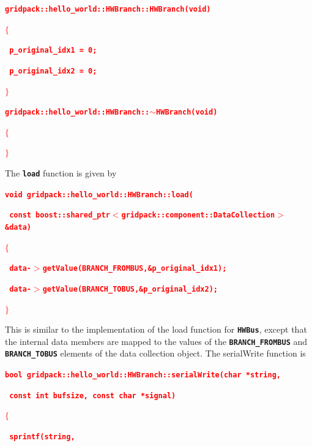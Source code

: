 \documentclass[12pt]{report} %
\begin{document}
\textcolor{red}{\texttt{\textbf{gridpack::hello\_world::HWBranch::HWBranch(void)}}}

\textcolor{red}{\texttt{\textbf{$\boldsymbol{\mathrm{\{}}$}}}

\textcolor{red}{\texttt{\textbf{  p\_original\_idx1 = 0;}}}

\textcolor{red}{\texttt{\textbf{  p\_original\_idx2 = 0;}}}

\textcolor{red}{\texttt{\textbf{$\boldsymbol{\mathrm{\}}}$}}}

\textcolor{red}{\texttt{\textbf{gridpack::hello\_world::HWBranch::$\boldsymbol{\mathrm{\sim}}$HWBranch(void)}}}

\textcolor{red}{\texttt{\textbf{$\boldsymbol{\mathrm{\{}}$}}}

\textcolor{red}{\texttt{\textbf{$\boldsymbol{\mathrm{\}}}$}}}

The \texttt{\textbf{load}} function is given by

\textcolor{red}{\texttt{\textbf{void gridpack::hello\_world::HWBranch::load(}}}

\textcolor{red}{\texttt{\textbf{    const boost::shared\_ptr$\boldsymbol{\mathrm{<}}$gridpack::component::DataCollection$\boldsymbol{\mathrm{>}}$ \&data)}}}

\textcolor{red}{\texttt{\textbf{$\boldsymbol{\mathrm{\{}}$}}}

\textcolor{red}{\texttt{\textbf{  data-$\boldsymbol{\mathrm{>}}$getValue(BRANCH\_FROMBUS,\&p\_original\_idx1);}}}

\textcolor{red}{\texttt{\textbf{  data-$\boldsymbol{\mathrm{>}}$getValue(BRANCH\_TOBUS,\&p\_original\_idx2);}}}

\textcolor{red}{\texttt{\textbf{$\boldsymbol{\mathrm{\}}}$}}}

This is similar to the implementation of the load function for \texttt{\textbf{HWBus}}, except that the internal data members are mapped to the values of the \texttt{\textbf{BRANCH\_FROMBUS}} and \texttt{\textbf{BRANCH\_TOBUS}} elements of the data collection object. The serialWrite function is

\textcolor{red}{\texttt{\textbf{bool gridpack::hello\_world::HWBranch::serialWrite(char *string,}}}

\textcolor{red}{\texttt{\textbf{    const int bufsize, const char *signal)}}}

\textcolor{red}{\texttt{\textbf{$\boldsymbol{\mathrm{\{}}$}}}

\textcolor{red}{\texttt{\textbf{  sprintf(string,}}}
\end{document}

